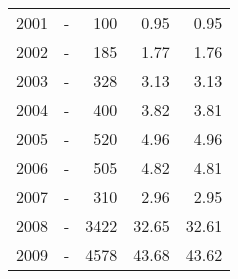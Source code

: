 \begin{longtable}{lXrrr}
        2001 & \multicolumn{1}{X}{-} & %
          \num{100} &
          \num[round-mode=places,round-precision=2]{0.95} &
          \num[round-mode=places,round-precision=2]{0.95} \\

        2002 & \multicolumn{1}{X}{-} & %
          \num{185} &
          \num[round-mode=places,round-precision=2]{1.77} &
          \num[round-mode=places,round-precision=2]{1.76} \\

        2003 & \multicolumn{1}{X}{-} & %
          \num{328} &
          \num[round-mode=places,round-precision=2]{3.13} &
          \num[round-mode=places,round-precision=2]{3.13} \\

        2004 & \multicolumn{1}{X}{-} & %
          \num{400} &
          \num[round-mode=places,round-precision=2]{3.82} &
          \num[round-mode=places,round-precision=2]{3.81} \\

        2005 & \multicolumn{1}{X}{-} & %
          \num{520} &
          \num[round-mode=places,round-precision=2]{4.96} &
          \num[round-mode=places,round-precision=2]{4.96} \\

        2006 & \multicolumn{1}{X}{-} & %
          \num{505} &
          \num[round-mode=places,round-precision=2]{4.82} &
          \num[round-mode=places,round-precision=2]{4.81} \\

        2007 & \multicolumn{1}{X}{-} & %
          \num{310} &
          \num[round-mode=places,round-precision=2]{2.96} &
          \num[round-mode=places,round-precision=2]{2.95} \\

        2008 & \multicolumn{1}{X}{-} & %
          \num{3422} &
          \num[round-mode=places,round-precision=2]{32.65} &
          \num[round-mode=places,round-precision=2]{32.61} \\

        2009 & \multicolumn{1}{X}{-} & %
          \num{4578} &
          \num[round-mode=places,round-precision=2]{43.68} &
          \num[round-mode=places,round-precision=2]{43.62} \\


\end{longtable}
